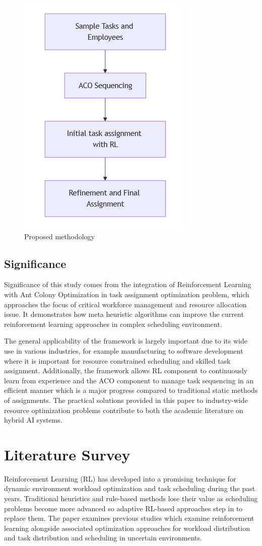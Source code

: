 \documentclass[%
aip,
cp,  %
amsmath,amssymb,
reprint,%
]{revtex4-2}
\begin{document}
	\begin{figure}[!hb]
		\centering
		\includegraphics[width=0.3\linewidth]{figures/Initial_flow}
		\caption{\label{fig:flow}Proposed methodology}
	\end{figure}
	
	\subsection{\label{subsec:significance}Significance}
	Significance of this study comes from the integration of Reinforcement Learning
	with Ant Colony Optimization in task assignment optimization problem, which
	approaches the focus of critical workforce management and resource allocation
	issue. It demonstrates how meta heuristic algorithms can improve the current reinforcement
	learning approaches in complex scheduling environment.
	
	The general applicability of the framework is largely important due to its wide
	use in various industries, for example manufacturing to software development
	where it is important for resource constrained scheduling and skilled task
	assignment. Additionally, the framework allows RL component to continuously
	learn from experience and the ACO component to manage task sequencing in an
	efficient manner which is a major progress compared to traditional static
	methods of assignments. The practical solutions provided in this paper to industry-wide
	resource optimization problems contribute to both the academic literature on hybrid
	AI systems.
	
	\section{\label{sec:lit}Literature Survey}
	Reinforcement Learning (RL) has developed into a promising technique for dynamic
	environment workload optimization and task scheduling during the past years.
	Traditional heuristics and rule-based methods lose their value as scheduling
	problems become more advanced so adaptive RL-based approaches step in to
	replace them. The paper examines previous studies which examine reinforcement learning
	alongside associated optimization approaches for workload distribution and task
	distribution and scheduling in uncertain environments.
	
\end{document}
